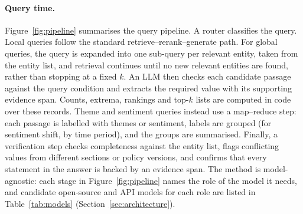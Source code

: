 \documentclass[11pt,letterpaper,oneside]{report}
\begin{document}
\paragraph{Query time.}
Figure~\ref{fig:pipeline} summarises the query pipeline. A router classifies
the query. Local queries follow the standard retrieve--rerank--generate path.
For global queries, the query is expanded into one sub-query per relevant
entity, taken from the entity list, and retrieval continues until no new
relevant entities are found, rather than stopping at a fixed $k$. An LLM then
checks each candidate passage against the query condition and extracts the
required value with its supporting evidence span. Counts, extrema, rankings
and top-$k$ lists are computed in code over these records. Theme and
sentiment queries instead use a map--reduce step: each passage is labelled
with themes or sentiment, labels are grouped (for sentiment shift, by time
period), and the groups are summarised. Finally, a verification step checks
completeness against the entity list, flags conflicting values from different
sections or policy versions, and confirms that every statement in the answer
is backed by an evidence span.
The method is model-agnostic: each stage in Figure~\ref{fig:pipeline} names
the role of the model it needs, and candidate open-source and API models for
each role are listed in Table~\ref{tab:models} (Section~\ref{sec:architecture}).
\end{document}

